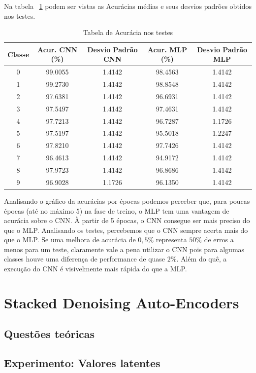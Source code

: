 \documentclass[12pt, a4paper, brazil, portuguese]{article}
\begin{document}
Na tabela ~\ref{tab:testes_um} podem ser vistas as Acurácias médias e seus desvios padrões obtidos
nos testes.
\begin{table}[h]
  \begin{tabular}{ c c  c  c  c }
    Classe & Acur. CNN (\%) & Desvio Padrão CNN & Acur. MLP (\%) & Desvio Padrão MLP \\
    \hline
    0 & 99.0055 & 1.4142 & 98.4563 & 1.4142 \\
    1 & 99.2730 & 1.4142 & 98.8548 & 1.4142 \\
    2 & 97.6381 & 1.4142 & 96.6931 & 1.4142 \\
    3 & 97.5497 & 1.4142 & 97.4631 & 1.4142 \\
    4 & 97.7213 & 1.4142 & 96.7287 & 1.1726 \\
    5 & 97.5197 & 1.4142 & 95.5018 & 1.2247 \\
    6 & 97.8210 & 1.4142 & 97.7426 & 1.4142 \\
    7 & 96.4613 & 1.4142 & 94.9172 & 1.4142 \\
    8 & 97.9723 & 1.4142 & 96.8686 & 1.4142 \\
    9 & 96.9028 & 1.1726 & 96.1350 & 1.4142 \\
  \end{tabular}
  \caption{Tabela de Acurácia nos testes}
  \label{tab:testes_um}
\end{table}

Analisando o gráfico da acurácias por épocas podemos perceber que, para poucas épocas (até no máximo
5) na fase de treino, o MLP tem uma vantagem de acurácia sobre o CNN. À partir de 5 épocas, o CNN
consegue ser mais preciso do que o MLP. Analisando os testes, percebemos que o CNN sempre acerta
mais do que o MLP. Se uma melhora de acurácia de $0,5\%$ representa $50\%$ de erros a menos para um
teste, claramente vale a pena utilizar o CNN pois para algumas classes houve uma diferença de
performance de quase $2\%$. Além do quê, a execução do CNN é visivelmente mais rápida do que a MLP.

\section{Stacked Denoising Auto-Encoders}
\subsection{Questões teóricas}
\subsection{Experimento: Valores latentes}
\end{document}
